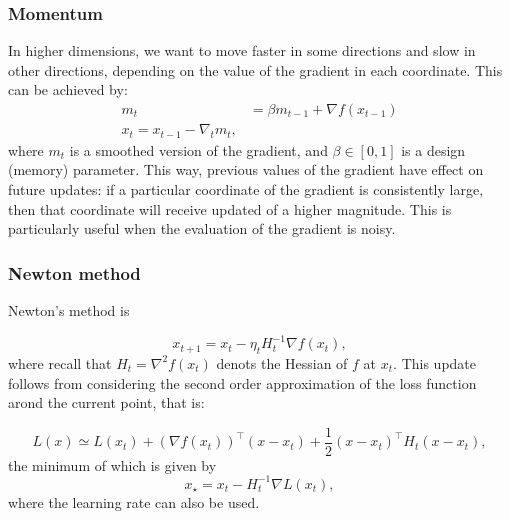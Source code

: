 \subsubsection{Momentum}
\label{ssub:momentum}

In higher dimensions, we want to move faster in some directions and slow in other directions, depending on the value of the gradient in each coordinate. This can be achieved by: 
\begin{align}
	m_t &= \beta m_{t-1} + \nabla f(x_{t-1})\\
	x_t = x_{t-1} - \nabla_t m_t,
\end{align}
where $m_t$ is a smoothed version of the gradient, and $\beta\in[0,1]$ is a design (memory) parameter. This way, previous values of the gradient have effect on future updates: if a particular coordinate of the gradient is consistently large, then that coordinate will receive updated of a higher magnitude. This is particularly useful when the evaluation of the gradient is noisy. 

\subsubsection{Newton method}
\label{ssub:newton}
Newton's method is

\begin{equation}
	x_{t+1} = x_t -\eta_t H_t^{-1}\nabla f(x_t),	
\end{equation}
where recall that $H_t = \nabla^2 f(x_t)$ denots the Hessian of $f$ at $x_t$. This update follows from considering the second order approximation of the loss function arond the current point, that is: 

\begin{equation}
	L(x) \simeq L(x_t) + (\nabla f(x_t))^\top(x-x_t) + \frac{1}{2} (x-x_t)^\top H_t  (x-x_t),
\end{equation}
the minimum of which is given by 
\begin{equation}
	x_\star = x_t - H^{-1}_t\nabla L(x_t),
\end{equation}
where the learning rate can also be used. 

\begin{mdframed}[style=ejemplo, frametitle={\center Example: convergence for a parabola (2)}]


\end{mdframed}



